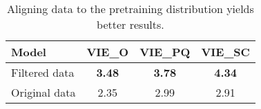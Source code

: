 \begin{table}[!ht]
    \centering
    \caption{Aligning \ours data to the pretraining distribution yields better results.}
    \label{tab:filtered-data}
    \begin{tabular}{lccc}
    \toprule
    \textbf{Model} & \textbf{VIE\_O} & \textbf{VIE\_PQ} & \textbf{VIE\_SC} \\
    \midrule
    Filtered data & \textbf{3.48} & \textbf{3.78} & \textbf{4.34} \\
    Original data & 2.35 & 2.99 & 2.91 \\
    \bottomrule
    \end{tabular}
\end{table}
